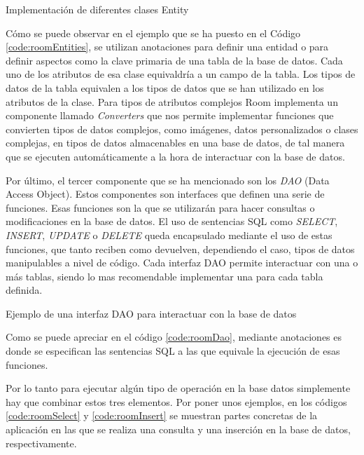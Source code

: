\begin{code}
	\caption{Implementación de diferentes clases Entity}
	\label{code:roomEntities}
	
\end{code}

Cómo se puede observar en el ejemplo que se ha puesto en el Código \ref{code:roomEntities}, se utilizan anotaciones para definir una entidad o para definir aspectos como la clave primaria de una tabla de la base de datos. Cada uno de los atributos de esa clase equivaldría a un campo de la tabla. Los tipos de datos de la tabla equivalen a los tipos de datos que se han utilizado en los atributos de la clase. Para tipos de atributos complejos Room implementa un componente llamado \textit{Converters} que nos permite implementar funciones que convierten tipos de datos complejos, como imágenes, datos personalizados o clases complejas, en tipos de datos almacenables en una base de datos, de tal manera que se ejecuten automáticamente a la hora de interactuar con la base de datos.

Por último, el tercer componente que se ha mencionado son los \textit{DAO} (Data Access Object). Estos componentes son interfaces que definen una serie de funciones. Esas funciones son la que se utilizarán para hacer consultas o modificaciones en la base de datos. El uso de sentencias SQL como \textit{SELECT}, \textit{INSERT}, \textit{UPDATE} o \textit{DELETE} queda encapsulado mediante el uso de estas funciones, que tanto reciben como devuelven, dependiendo el caso, tipos de datos manipulables a nivel de código. Cada interfaz DAO permite interactuar con una o más tablas, siendo lo mas recomendable implementar una para cada tabla definida.

\begin{code}
	\caption{Ejemplo de una interfaz DAO para interactuar con la base de datos}
	\label{code:roomDao}
	
\end{code}

Como se puede apreciar en el código \ref{code:roomDao}, mediante anotaciones es donde se especifican las sentencias SQL a las que equivale la ejecución de esas funciones.

Por lo tanto para ejecutar algún tipo de operación en la base datos simplemente hay que combinar estos tres elementos. Por poner unos ejemplos, en los códigos \ref{code:roomSelect} y \ref{code:roomInsert} se muestran partes concretas de la aplicación en las que se realiza una consulta y una inserción en la base de datos, respectivamente.


